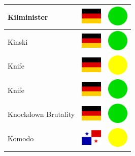 \documentclass[12pt, a4paper, twoside]{report}
\begin{document}
\begin{center}
\begin{longtable}{|p{5cm}|p{2cm}|p{2cm}|}
 Kilminister                                                & \includegraphics[width=1cm]{../4x3/de} &   \includegraphics[width=1cm]{../likes/y} \\ \hline
 Kinski                                                     & \includegraphics[width=1cm]{../4x3/de} &   \includegraphics[width=1cm]{../likes/y} \\ \hline
 Knife                                                      & \includegraphics[width=1cm]{../4x3/de} &   \includegraphics[width=1cm]{../likes/m} \\ \hline
 Knife                                                      & \includegraphics[width=1cm]{../4x3/de} &   \includegraphics[width=1cm]{../likes/y} \\ \hline
 Knockdown Brutality                                        & \includegraphics[width=1cm]{../4x3/de} &   \includegraphics[width=1cm]{../likes/y} \\ \hline
 Komodo                                                     & \includegraphics[width=1cm]{../4x3/pa} &   \includegraphics[width=1cm]{../likes/m} \\ \hline

\end{longtable}
\end{center}
\end{document}
